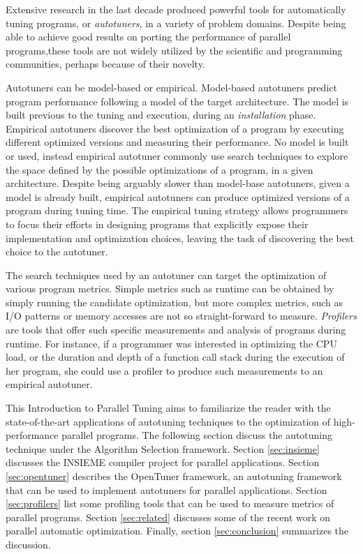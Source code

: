 \documentclass[a4paper, 12pt]{article}
\begin{document}
Extensive research in the last decade produced powerful tools for
automatically tuning programs, or \emph{autotuners}, in a variety of problem
domains. Despite being able to achieve good results on porting the performance
of parallel programs,these tools are not widely utilized by the scientific
and programming communities, perhaps because of their novelty.

Autotuners can be model-based or empirical. Model-based autotuners predict
program performance following a model of the target architecture. The model
is built previous to the tuning and execution, during an \emph{installation}
phase. Empirical autotuners discover the best optimization of a program by
executing different optimized versions and measuring their performance. No
model is built or used, instead empirical autotuner commonly use search
techniques to explore the space defined by the possible optimizations
of a program, in a given architecture. Despite being arguably slower than
model-base autotuners, given a model is already built, empirical autotuners
can produce optimized versions of a program during tuning time. The empirical
tuning strategy allows programmers to focus their efforts in designing
programs that explicitly expose their implementation and optimization choices,
leaving the task of discovering the best choice to the autotuner.

The search techniques used by an autotuner can target the optimization of
various program metrics. Simple metrics such as runtime can be obtained by
simply running the candidate optimization, but more complex metrics, such
as I/O patterns or memory accesses are not so straight-forward to measure.
\emph{Profilers} are tools that offer such specific measurements and analysis
of programs during runtime. For instance, if a programmer was interested in
optimizing the CPU load, or the duration and depth of a function call stack
during the execution of her program, she could use a profiler to produce such
measurements to an empirical autotuner.

This Introduction to Parallel Tuning aims to familiarize the reader with the
state-of-the-art applications of autotuning techniques to the optimization
of high-performance parallel programs. The following section discuss the
autotuning technique under the Algorithm Selection framework. Section
\ref{sec:insieme} discusses the INSIEME compiler project for parallel
applications. Section \ref{sec:opentuner} describes the OpenTuner framework,
an autotuning framework that can be used to implement autotuners for parallel
applications. Section \ref{sec:profilers} list some profiling tools that can
be used to measure metrics of parallel programs. Section \ref{sec:related}
discusses some of the recent work on parallel automatic optimization.
Finally, section \ref{sec:conclusion} summarizes the discussion.
\end{document}
